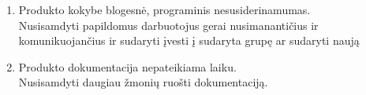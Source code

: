 \documentclass[a4paper,12pt]{article}
\begin{document}
\begin{enumerate}
	\item Produkto kokybe blogesn\. e, programinis nesusiderinamumas. \\ 
  			Nusisamdyti papildomus darbuotojus gerai nusimananti\v cius ir komunikuojan\v cius
  			ir sudaryti \k ivesti \k i sudaryta grup\k e ar sudaryti nauj\k a
  		
	\item Produkto dokumentacija nepateikiama laiku.\\
  			Nusisamdyti daugiau \v zmoni\k u ruo\v sti dokumentacij\k a.


\end{enumerate}
\end{document}
